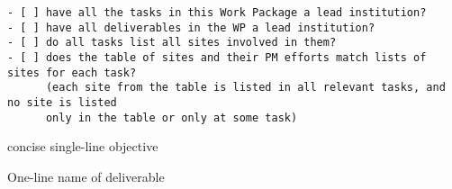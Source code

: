 \begin{draft}
\begin{verbatim}
- [ ] have all the tasks in this Work Package a lead institution?
- [ ] have all deliverables in the WP a lead institution?
- [ ] do all tasks list all sites involved in them?
- [ ] does the table of sites and their PM efforts match lists of sites for each task?
      (each site from the table is listed in all relevant tasks, and no site is listed
      only in the table or only at some task)
\end{verbatim}
\end{draft}

\begin{workpackage}[
  id=template,
  wphases=0-36,
  swsites,
  title=Work Package Title,
  short=ShortTitle,
  lead=XXX,
  SRLRM=1,
  XXXRM=2,
]

\begin{wpobjectives}
 \begin{compactitem}
   \item concise single-line objective
 \end{compactitem}
\end{wpobjectives}

\begin{wpdescription}


\end{wpdescription}

\begin{tasklist}

\end{tasklist}


\begin{wpdelivs}
\begin{wpdeliv}[
    id=deliv,
    lead=XXX,
    due=12,
    dissem=PU,
    nature=DEC,
]
  {
  One-line name of deliverable
  }
\end{wpdeliv}
\end{wpdelivs}
\end{workpackage}

